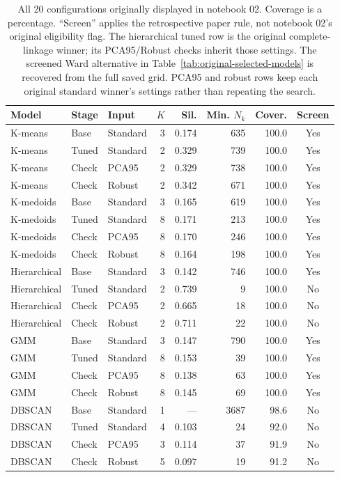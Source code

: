 \begin{table}[htbp]
\centering
\footnotesize
\begin{tabularx}{\textwidth}{@{}Xllrrrrc@{}}
\toprule
Model & Stage & Input & $K$ & Sil. & Min. $N_k$ & Cover. & Screen\\
\midrule
K-means & Base & Standard & 3 & 0.174 & 635 & 100.0 & Yes\\
K-means & Tuned & Standard & 2 & 0.329 & 739 & 100.0 & Yes\\
K-means & Check & PCA95 & 2 & 0.329 & 738 & 100.0 & Yes\\
K-means & Check & Robust & 2 & 0.342 & 671 & 100.0 & Yes\\
K-medoids & Base & Standard & 3 & 0.165 & 619 & 100.0 & Yes\\
K-medoids & Tuned & Standard & 8 & 0.171 & 213 & 100.0 & Yes\\
K-medoids & Check & PCA95 & 8 & 0.170 & 246 & 100.0 & Yes\\
K-medoids & Check & Robust & 8 & 0.164 & 198 & 100.0 & Yes\\
Hierarchical & Base & Standard & 3 & 0.142 & 746 & 100.0 & Yes\\
Hierarchical & Tuned & Standard & 2 & 0.739 & 9 & 100.0 & No\\
Hierarchical & Check & PCA95 & 2 & 0.665 & 18 & 100.0 & No\\
Hierarchical & Check & Robust & 2 & 0.711 & 22 & 100.0 & No\\
GMM & Base & Standard & 3 & 0.147 & 790 & 100.0 & Yes\\
GMM & Tuned & Standard & 8 & 0.153 & 39 & 100.0 & Yes\\
GMM & Check & PCA95 & 8 & 0.138 & 63 & 100.0 & Yes\\
GMM & Check & Robust & 8 & 0.145 & 69 & 100.0 & Yes\\
DBSCAN & Base & Standard & 1 & --- & 3687 & 98.6 & No\\
DBSCAN & Tuned & Standard & 4 & 0.103 & 24 & 92.0 & No\\
DBSCAN & Check & PCA95 & 3 & 0.114 & 37 & 91.9 & No\\
DBSCAN & Check & Robust & 5 & 0.097 & 19 & 91.2 & No\\
\bottomrule
\end{tabularx}
\caption{All 20 configurations originally displayed in notebook 02. Coverage is a percentage. ``Screen'' applies the retrospective paper rule, not notebook 02's original eligibility flag. The hierarchical tuned row is the original complete-linkage winner; its PCA95/Robust checks inherit those settings. The screened Ward alternative in Table~\ref{tab:original-selected-models} is recovered from the full saved grid. PCA95 and robust rows keep each original standard winner's settings rather than repeating the search.}
\label{tab:original-inventory}
\end{table}
